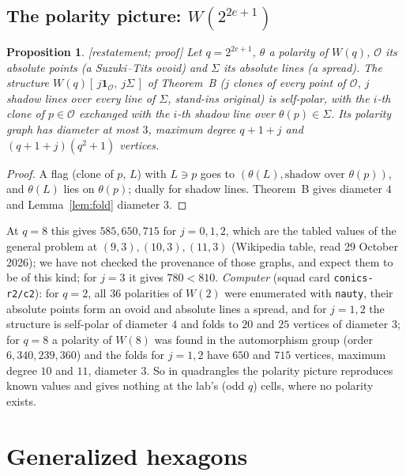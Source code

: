 \documentclass[11pt]{amsart}
\newtheorem{proposition}[theorem]{Proposition}
\theoremstyle{definition}
\theoremstyle{remark}
\newcommand{\cO}{\mathcal{O}}
\newcommand{\status}[1]{\textup{[#1]}}
\begin{document}
\subsection{The polarity picture: $W(2^{2e+1})$}
\begin{proposition}\label{prop:wfold}
\status{restatement; proof} Let $q=2^{2e+1}$, $\theta$ a polarity of $W(q)$, $\cO$ its absolute points (a Suzuki--Tits
ovoid) and $\Sigma$ its absolute lines (a spread). The structure $W(q)[\,j\mathbf 1_\cO,\ j\Sigma\,]$ of Theorem~B
($j$ clones of every point of $\cO$, $j$ shadow lines over every line of $\Sigma$, stand-ins original) is self-polar,
with the $i$-th clone of $p\in\cO$ exchanged with the $i$-th shadow line over $\theta(p)\in\Sigma$. Its polarity graph
has diameter at most $3$, maximum degree $q+1+j$ and $(q+1+j)(q^2+1)$ vertices.
\end{proposition}
\begin{proof}
A flag (clone of $p$, $L$) with $L\ni p$ goes to $(\theta(L),\text{shadow over }\theta(p))$, and $\theta(L)$ lies on
$\theta(p)$; dually for shadow lines. Theorem~B gives diameter $4$ and Lemma~\ref{lem:fold} diameter $3$.
\end{proof}

At $q=8$ this gives $585,650,715$ for $j=0,1,2$, which are the tabled values of the general problem at
$(9,3),(10,3),(11,3)$ (Wikipedia table, read 29 October 2026); we have not checked the provenance of those graphs,
and expect them to be of this kind; for $j=3$ it gives $780<810$. \emph{Computer} (squad card \texttt{conics-r2/c2}): for $q=2$, all $36$ polarities of $W(2)$ were
enumerated with \texttt{nauty}, their absolute points form an ovoid and absolute lines a spread, and for $j=1,2$ the
structure is self-polar of diameter $4$ and folds to $20$ and $25$ vertices of diameter $3$; for $q=8$ a polarity of
$W(8)$ was found in the automorphism group (order $6{,}340{,}239{,}360$) and the folds for $j=1,2$ have $650$ and $715$
vertices, maximum degree $10$ and $11$, diameter $3$. So in quadrangles the polarity picture reproduces
known values and gives nothing at the lab's (odd $q$) cells, where no polarity exists.

\section{Generalized hexagons}
\end{document}
